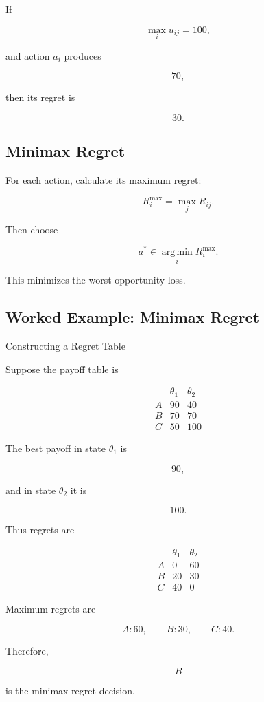 If

\[
\max_i
u_{ij}
=
100,
\]

and action \(a_i\) produces

\[
70,
\]

then its regret is

\[
\boxed{
30.
}
\]

\subsection{Minimax Regret}
\label{subsec:minimax-regret}

For each action, calculate its maximum regret:

\[
\boxed{
R_i^{\max}
=
\max_j
R_{ij}.
}
\]

Then choose

\[
\boxed{
a^*
\in
\operatorname*{arg\,min}_i
R_i^{\max}.
}
\]

This minimizes the worst opportunity loss.

\subsection{Worked Example: Minimax Regret}
\label{subsec:worked-minimax-regret}

\begin{workedexamplebox}{Constructing a Regret Table}

Suppose the payoff table is

\[
\begin{array}{c|cc}
&
\theta_1
&
\theta_2
\\
\hline
A
&
90
&
40
\\
B
&
70
&
70
\\
C
&
50
&
100
\end{array}
\]

The best payoff in state \(\theta_1\) is

\[
90,
\]

and in state \(\theta_2\) it is

\[
100.
\]

Thus regrets are

\[
\begin{array}{c|cc}
&
\theta_1
&
\theta_2
\\
\hline
A
&
0
&
60
\\
B
&
20
&
30
\\
C
&
40
&
0
\end{array}
\]

Maximum regrets are

\[
A:60,
\qquad
B:30,
\qquad
C:40.
\]

Therefore,

\begin{answerbox}
\[
\boxed{
B
}
\]

is the minimax-regret decision.
\end{answerbox}

\end{workedexamplebox}

